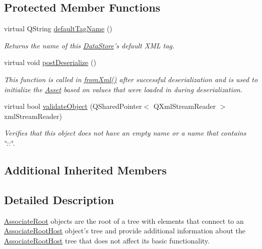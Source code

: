 \subsection*{Protected Member Functions}
\begin{DoxyCompactItemize}
\item 
virtual Q\-String \hyperlink{class_picto_1_1_associate_root_a340826a71553495784c3ad2e4cdd9956}{default\-Tag\-Name} ()
\begin{DoxyCompactList}\small\item\em Returns the name of this \hyperlink{class_picto_1_1_data_store}{Data\-Store}'s default X\-M\-L tag. \end{DoxyCompactList}\item 
virtual void \hyperlink{class_picto_1_1_associate_root_a8b54b44c423e63c6d98091aa3dee108a}{post\-Deserialize} ()
\begin{DoxyCompactList}\small\item\em This function is called in \hyperlink{class_picto_1_1_asset_a8bed4da09ecb1c07ce0dab313a9aba67}{from\-Xml()} after successful deserialization and is used to initialize the \hyperlink{class_picto_1_1_asset}{Asset} based on values that were loaded in during deserialization. \end{DoxyCompactList}\item 
\hypertarget{class_picto_1_1_associate_root_a399158938e3f9c09644a20faece3e2b2}{virtual bool \hyperlink{class_picto_1_1_associate_root_a399158938e3f9c09644a20faece3e2b2}{validate\-Object} (Q\-Shared\-Pointer$<$ Q\-Xml\-Stream\-Reader $>$ xml\-Stream\-Reader)}\label{class_picto_1_1_associate_root_a399158938e3f9c09644a20faece3e2b2}

\begin{DoxyCompactList}\small\item\em Verifies that this object does not have an empty name or a name that contains \char`\"{}\-::\char`\"{}. \end{DoxyCompactList}\end{DoxyCompactItemize}
\subsection*{Additional Inherited Members}


\subsection{Detailed Description}
\hyperlink{class_picto_1_1_associate_root}{Associate\-Root} objects are the root of a tree with elements that connect to an \hyperlink{class_picto_1_1_associate_root_host}{Associate\-Root\-Host} object's tree and provide additional information about the \hyperlink{class_picto_1_1_associate_root_host}{Associate\-Root\-Host} tree that does not affect its basic functionality. 

